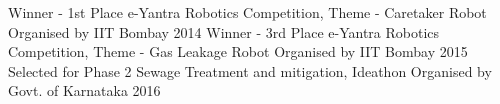 \begin{cvhonors}
  \cvhonor
    {Winner - 1st Place}
    {e-Yantra Robotics Competition, Theme - Caretaker Robot}
    {Organised by IIT Bombay}
    {2014}
  \cvhonor
    {Winner - 3rd Place}
    {e-Yantra Robotics Competition, Theme - Gas Leakage Robot}
    {Organised by IIT Bombay}
    {2015}
  \cvhonor
    {Selected for Phase 2}
    {Sewage Treatment and mitigation, Ideathon}
    {Organised by Govt. of Karnataka }
    {2016}
\end{cvhonors}
